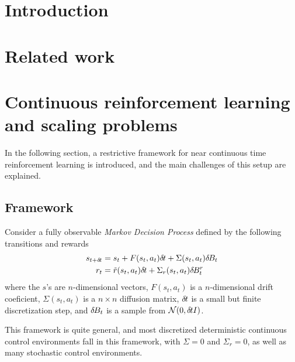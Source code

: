 \documentclass{article}
\begin{document}
\printAffiliationsAndNotice{\icmlEqualContribution} %

\begin{abstract}

\end{abstract}

\section{Introduction}
\label{sec:intro}

\section{Related work}
\label{sec:related}

\section{Continuous reinforcement learning and scaling problems}
\label{sec:continous}
In the following section, a restrictive framework for near continuous
time reinforcement learning is introduced, and the main challenges of this
setup are explained. 

\subsection{Framework}
Consider a fully observable \emph{Markov Decision Process} defined by the following
transitions and rewards
\begin{align}
	s_{t + \delta\hspace{-.1em}t} &= s_t + F(s_t, a_t) \delta\hspace{-.1em}t + \Sigma(s_t, a_t) \delta\hspace{-.1em}B_t\\
	r_{t} &= \tilde{r}(s_t, a_t) \delta\hspace{-.1em}t + \Sigma_r(s_t, a_t) \delta\hspace{-.1em}B_t^r
\end{align}
where the $s$'s are $n$-dimensional vectors, $F(s_t, a_t)$ is a $n$-dimensional
drift coeficient, $\Sigma(s_t, a_t)$ is a $n \times n$ diffusion matrix,
$\delta\hspace{-.1em}t$ is a small but finite discretization step, and $\delta\hspace{-.1em}B_t$ is a sample
from $\mathcal{N}(0, \delta\hspace{-.1em}t I)$.

This framework is quite general, and most discretized deterministic continuous
control environments fall in this framework, with $\Sigma = 0$ and $\Sigma_r =
0$, as well as many stochastic control environments.
\end{document}
